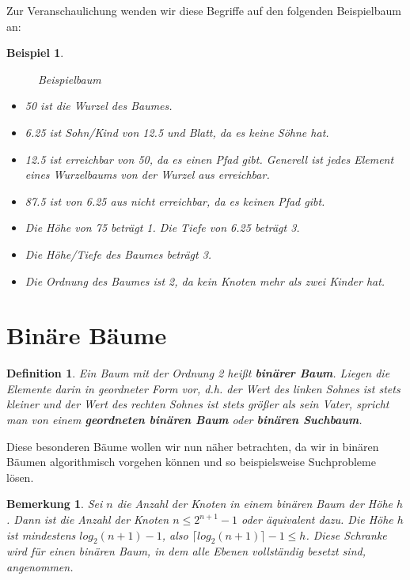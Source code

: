 \documentclass[11pt,a4paper]{scrartcl}
\newtheorem{note}{Bemerkung}
\newtheorem{definition}{Definition}
\newtheorem{example}{Beispiel}
\begin{document}
Zur Veranschaulichung wenden wir diese Begriffe auf den folgenden Beispielbaum an: \\
\begin{example}
\begin{figure}[h]
\centering
{}
\caption{Beispielbaum}
\end{figure}
\begin{itemize}
\item 50 ist die Wurzel des Baumes.
\item 6.25 ist Sohn/Kind von 12.5 und Blatt, da es keine Söhne hat.
\item 12.5 ist erreichbar von 50, da es einen Pfad gibt. Generell ist jedes Element eines Wurzelbaums von der Wurzel aus erreichbar.
\item 87.5 ist von 6.25 aus nicht erreichbar, da es keinen Pfad gibt.
\item Die Höhe von 75 beträgt 1. Die Tiefe von 6.25 beträgt 3.
\item Die Höhe/Tiefe des Baumes beträgt 3.
\item Die Ordnung des Baumes ist 2, da kein Knoten mehr als zwei Kinder hat.
\end{itemize}
\end{example}
\section{Binäre Bäume}
\begin{definition}
Ein Baum mit der Ordnung 2 heißt \textbf{binärer Baum}. Liegen die Elemente darin in geordneter Form vor, d.h. der Wert des linken Sohnes ist stets kleiner und der Wert des rechten Sohnes ist stets größer als sein Vater, spricht man von einem \textbf{geordneten binären Baum} \parencite{Wirth} oder \textbf{binären Suchbaum}.
\end{definition}
Diese besonderen Bäume wollen wir nun näher betrachten, da wir in binären Bäumen algorithmisch vorgehen können und so beispielsweise Suchprobleme lösen.
\begin{note}
Sei $n$ die Anzahl der Knoten in einem binären Baum der Höhe $h$. Dann ist die Anzahl der Knoten $n \leq 2^{n+1}-1$ oder äquivalent dazu. Die Höhe $h$ ist mindestens $log_{2}(n+1)-1$, also $\lceil log_{2}(n+1) \rceil -1 \leq h$. Diese Schranke wird für einen binären Baum, in dem alle Ebenen vollständig besetzt sind, angenommen.
\end{note}
\end{document}
